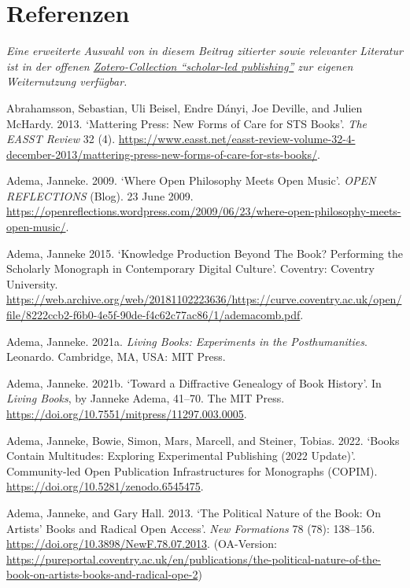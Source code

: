\documentclass[a4paper,
fontsize=11pt,
oneside,
numbers=noperiodatend,
parskip=half-,
bibliography=totoc,
final
]{scrartcl}
\begin{document}
\hypertarget{referenzen}{%
\section{Referenzen}\label{referenzen}}

\emph{Eine erweiterte Auswahl von in diesem Beitrag zitierter sowie
relevanter Literatur ist in der offenen
\href{https://www.zotero.org/groups/2346073/open_research_open_science_open_scholarship/collections/9L48YBXU}{Zotero-Collection
\enquote{scholar-led publishing}} zur eigenen Weiternutzung verfügbar.}

Abrahamsson, Sebastian, Uli Beisel, Endre Dányi, Joe Deville, and Julien
McHardy. 2013. \enquote*{Mattering Press: New Forms of Care for STS
Books}. \emph{The EASST Review} 32 (4).
\url{https://www.easst.net/easst-review-volume-32-4-december-2013/mattering-press-new-forms-of-care-for-sts-books/}.

Adema, Janneke. 2009. \enquote*{Where Open Philosophy Meets Open Music}.
\emph{OPEN REFLECTIONS} (Blog). 23 June 2009.
\url{https://openreflections.wordpress.com/2009/06/23/where-open-philosophy-meets-open-music/}.

Adema, Janneke 2015. \enquote*{Knowledge Production Beyond The Book?
Performing the Scholarly Monograph in Contemporary Digital Culture}.
Coventry: Coventry University.
\url{https://web.archive.org/web/20181102223636/https://curve.coventry.ac.uk/open/file/8222ccb2-f6b0-4e5f-90de-f4c62c77ac86/1/ademacomb.pdf}.

Adema, Janneke. 2021a. \emph{Living Books: Experiments in the
Posthumanities}. Leonardo. Cambridge, MA, USA: MIT Press.

Adema, Janneke. 2021b. \enquote*{Toward a Diffractive Genealogy of Book
History}. In \emph{Living Books}, by Janneke Adema, 41--70. The MIT
Press. \url{https://doi.org/10.7551/mitpress/11297.003.0005}.

Adema, Janneke, Bowie, Simon, Mars, Marcell, and Steiner, Tobias. 2022.
\enquote*{Books Contain Multitudes: Exploring Experimental Publishing
(2022 Update)}. Community-led Open Publication Infrastructures for
Monographs (COPIM). \url{https://doi.org/10.5281/zenodo.6545475}.

Adema, Janneke, and Gary Hall. 2013. \enquote*{The Political Nature of
the Book: On Artists} Books and Radical Open Access'. \emph{New
Formations} 78 (78): 138--156.
\url{https://doi.org/10.3898/NewF.78.07.2013}. (OA-Version:
\url{https://pureportal.coventry.ac.uk/en/publications/the-political-nature-of-the-book-on-artists-books-and-radical-ope-2})
\end{document}
